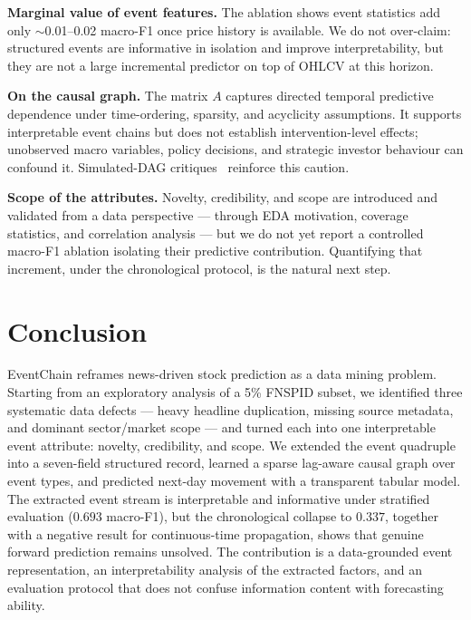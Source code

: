 \documentclass[sigconf,nonacm]{acmart}
\begin{document}
\textbf{Marginal value of event features.} The ablation shows event
statistics add only $\sim$0.01--0.02 macro-F1 once price history is
available. We do not over-claim: structured events are informative in
isolation and improve interpretability, but they are not a large
incremental predictor on top of OHLCV at this horizon.

\textbf{On the causal graph.} The matrix $A$ captures directed temporal
predictive dependence under time-ordering, sparsity, and acyclicity
assumptions. It supports interpretable event chains but does not
establish intervention-level effects; unobserved macro variables, policy
decisions, and strategic investor behaviour can confound it. Simulated-DAG
critiques~\cite{reisach} reinforce this caution.

\textbf{Scope of the attributes.} Novelty, credibility, and scope are
introduced and validated from a data perspective --- through EDA
motivation, coverage statistics, and correlation analysis --- but we do
not yet report a controlled macro-F1 ablation isolating their predictive
contribution. Quantifying that increment, under the chronological
protocol, is the natural next step.

\section{Conclusion}
EventChain reframes news-driven stock prediction as a data mining
problem. Starting from an exploratory analysis of a 5\% FNSPID subset, we
identified three systematic data defects --- heavy headline duplication,
missing source metadata, and dominant sector/market scope --- and turned
each into one interpretable event attribute: novelty, credibility, and
scope. We extended the event quadruple into a seven-field structured
record, learned a sparse lag-aware causal graph over event types, and
predicted next-day movement with a transparent tabular model. The
extracted event stream is interpretable and informative under stratified
evaluation ($0.693$ macro-F1), but the chronological collapse to $0.337$,
together with a negative result for continuous-time propagation, shows
that genuine forward prediction remains unsolved. The contribution is a
data-grounded event representation, an interpretability analysis of the
extracted factors, and an evaluation protocol that does not confuse
information content with forecasting ability.
\end{document}
